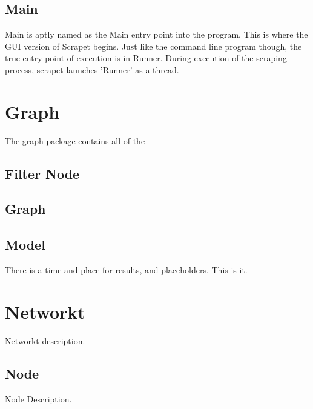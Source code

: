 \subsection{Main}
Main is aptly named as the Main entry point into the program. This is where the GUI version of Scrapet begins. Just like the command line program though, the true entry point of execution is in Runner. During execution of the scraping process, scrapet launches 'Runner' as a thread.
\section{Graph}
The graph package contains all of the 
\subsection{Filter Node}
\subsection{Graph}
\subsection{Model}
There is a time and place for results, and placeholders. This is it.\cite{latexcompanion}

\section{Networkt}
Networkt description.
\subsection{Node}
Node Description.

